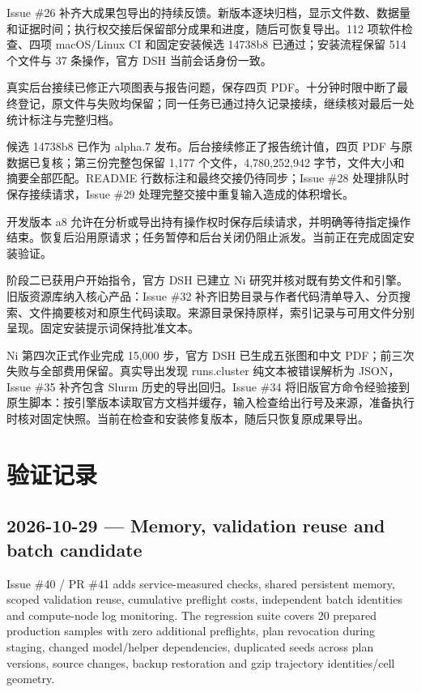 \documentclass[11pt,a4paper]{ctexart}
\begin{document}
Issue \#26 补齐大成果包导出的持续反馈。新版本逐块归档，显示文件数、数据量和证据时间；执行权交接后保留部分成果和进度，随后可恢复导出。112 项软件检查、四项 macOS/\allowbreak{}Linux CI 和固定安装候选 14738b8 已通过；安装流程保留 514 个文件与 37 条操作，官方 DSH 当前会话身份一致。



真实后台接续已修正六项图表与报告问题，保存四页 PDF。十分钟时限中断了最终登记，原文件与失败均保留；同一任务已通过持久记录接续，继续核对最后一处统计标注与完整归档。



候选 14738b8 已作为 alpha.7 发布。后台接续修正了报告统计值，四页 PDF 与原数据已复核；第三份完整包保留 1,177 个文件，4,780,252,942 字节，文件大小和摘要全部匹配。README 行数标注和最终交接仍待同步；Issue \#28 处理排队时保存接续请求，Issue \#29 处理完整交接中重复输入造成的体积增长。



开发版本 a8 允许在分析或导出持有操作权时保存后续请求，并明确等待指定操作结束。恢复后沿用原请求；任务暂停和后台关闭仍阻止派发。当前正在完成固定安装验证。





阶段二已获用户开始指令，官方 DSH 已建立 Ni 研究并核对既有势文件和引擎。旧版资源库纳入核心产品：Issue \#32 补齐旧势目录与作者代码清单导入、分页搜索、文件摘要核对和原生代码读取。来源目录保持原样，索引记录与可用文件分别呈现。固定安装提示词保持批准文本。



Ni 第四次正式作业完成 15,000 步，官方 DSH 已生成五张图和中文 PDF；前三次失败与全部费用保留。真实导出发现 runs.cluster 纯文本被错误解析为 JSON，Issue \#35 补齐包含 Slurm 历史的导出回归。Issue \#34 将旧版官方命令经验接到原生脚本：按引擎版本读取官方文档并缓存，输入检查给出行号及来源，准备执行时核对固定快照。当前在检查和安装修复版本，随后只恢复原成果导出。

\clearpage
\section{验证记录}


\subsection{2026-10-29 — Memory, validation reuse and batch candidate}


Issue \#40 /\allowbreak{} PR \#41 adds service-measured checks, shared persistent memory, scoped validation reuse, cumulative preflight costs, independent batch identities and compute-node log monitoring. The regression suite covers 20 prepared production samples with zero additional preflights, plan revocation during staging, changed model/\allowbreak{}helper dependencies, duplicated seeds across plan versions, source changes, backup restoration and gzip trajectory identities/\allowbreak{}cell geometry.
\end{document}
